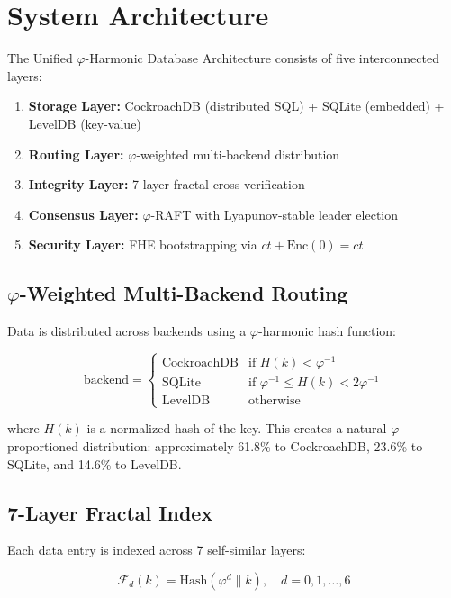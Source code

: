 \documentclass[11pt,a4paper]{article}
\begin{document}
\section{System Architecture}

The Unified $\varphi$-Harmonic Database Architecture consists of five interconnected layers:

\begin{enumerate}
    \item \textbf{Storage Layer:} CockroachDB (distributed SQL) + SQLite (embedded) + LevelDB (key-value)
    \item \textbf{Routing Layer:} $\varphi$-weighted multi-backend distribution
    \item \textbf{Integrity Layer:} 7-layer fractal cross-verification
    \item \textbf{Consensus Layer:} $\varphi$-RAFT with Lyapunov-stable leader election
    \item \textbf{Security Layer:} FHE bootstrapping via $ct + \text{Enc}(0) = ct$
\end{enumerate}

\subsection{$\varphi$-Weighted Multi-Backend Routing}

Data is distributed across backends using a $\varphi$-harmonic hash function:

\begin{equation}
\text{backend} = \begin{cases}
\text{CockroachDB} & \text{if } H(k) < \varphi^{-1} \\
\text{SQLite} & \text{if } \varphi^{-1} \leq H(k) < 2\varphi^{-1} \\
\text{LevelDB} & \text{otherwise}
\end{cases}
\end{equation}

where $H(k)$ is a normalized hash of the key. This creates a natural $\varphi$-proportioned distribution: approximately 61.8\% to CockroachDB, 23.6\% to SQLite, and 14.6\% to LevelDB.

\subsection{7-Layer Fractal Index}

Each data entry is indexed across 7 self-similar layers:

\begin{equation}
\mathcal{F}_d(k) = \text{Hash}\left(\varphi^d \parallel k\right), \quad d = 0, 1, \ldots, 6
\end{equation}
\end{document}
